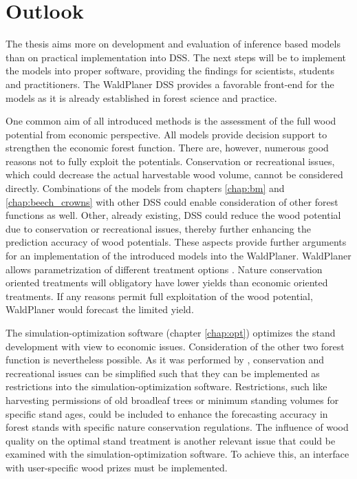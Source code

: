 \section{Outlook}
\label{sec:discussion:outlook}
The thesis aims more on development and evaluation of inference based models than on practical implementation into DSS. The next steps will be to implement the models into proper software, providing the findings for scientists, students and practitioners. The WaldPlaner DSS provides a favorable front-end for the models as it is already established in forest science and practice.

One common aim of all introduced methods is the assessment of the full wood potential from economic perspective. All models provide decision support to strengthen the economic forest function. There are, however, numerous good reasons not to fully exploit the potentials. Conservation or recreational issues, which could decrease the actual harvestable wood volume, cannot be considered directly. Combinations of the models from chapters \ref{chap:bm} and \ref{chap:beech_crowns} with other DSS could enable consideration of other forest functions as well. Other, already existing, DSS could reduce the wood potential due to conservation or recreational issues, thereby further enhancing the prediction accuracy of wood potentials. These aspects provide further arguments for an implementation of the introduced models into the WaldPlaner. WaldPlaner allows parametrization of different treatment options \citep[p. 90-93]{hansen_2014}. Nature conservation oriented treatments will obligatory have lower yields than economic oriented treatments. If any reasons permit full exploitation of the wood potential, WaldPlaner would forecast the limited yield.

The simulation-optimization software (chapter \ref{chap:opt}) optimizes the stand development with view to economic issues. Consideration of the other two forest function is nevertheless possible. As it was performed by \citet{yousefpour_2009}, conservation and recreational issues can be simplified such that they can be implemented as restrictions into the simulation-optimization software. Restrictions, such like harvesting permissions of old broadleaf trees or minimum standing volumes for specific stand ages, could be included to enhance the forecasting accuracy in forest stands with specific nature conservation regulations. The influence of wood quality on the optimal stand treatment is another relevant issue that could be examined with the simulation-optimization software. To achieve this, an interface with user-specific wood prizes must be implemented.


